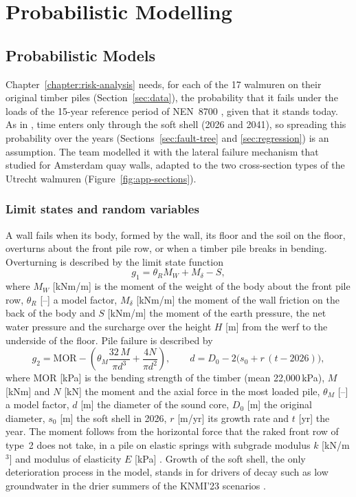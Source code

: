 \chapter{Probabilistic Modelling}
\label{chapter:probabilistic-modelling}

\section{Probabilistic Models}\label{sec:prob}

Chapter~\ref{chapter:risk-analysis} needs, for each of the 17 walmuren on
their original timber piles (Section~\ref{sec:data}), the probability that it
fails under the loads of the 15-year reference period of NEN~8700
\parencite{nen8700}, given that it stands today. As in \textcite{hemel2024},
time enters only through the soft shell (2026 and 2041), so spreading this
probability over the years (Sections~\ref{sec:fault-tree} and
\ref{sec:regression}) is an assumption. The team modelled it with the lateral failure mechanism that
\textcite{hemel2023,hemel2024} studied for Amsterdam quay walls, adapted to the
two cross-section types of the Utrecht walmuren \parencite{ibu2010,erfgoed156}
(Figure~\ref{fig:app-sections}).

\subsection{Limit states and random variables}\label{sec:prob-ls}

A wall fails when its body, formed by the wall, its floor and the soil on the
floor, overturns about the front pile row, or when a timber pile breaks in
bending. Overturning is described by the limit state function
\begin{equation}
g_1 = \theta_R M_W + M_\delta - S, \label{eq:g1}
\end{equation}
where $M_W$ [kNm/m] is the moment of the weight of the body about the front
pile row, $\theta_R$ [--] a model factor, $M_\delta$ [kNm/m] the moment of the
wall friction on the back of the body and $S$ [kNm/m] the moment of the earth
pressure, the net water pressure and the surcharge over the height $H$ [m]
from the werf to the underside of the floor. Pile failure is described by
\begin{equation}
g_2 = \mathrm{MOR} - \left(\theta_M \frac{32\,M}{\pi d^3} + \frac{4N}{\pi d^2}\right),
\qquad d = D_0 - 2\bigl(s_0 + r\,(t - 2026)\bigr), \label{eq:g2}
\end{equation}
where MOR [kPa] is the bending strength of the timber (mean 22{,}000\,kPa), $M$ [kNm] and $N$ [kN]
the moment and the axial force in the most loaded pile, $\theta_M$ [--] a
model factor, $d$ [m] the diameter of the sound core, $D_0$ [m] the original
diameter, $s_0$ [m] the soft shell in 2026, $r$ [m/yr] its growth rate and $t$
[yr] the year. The moment follows from the horizontal force that the raked
front row of type~2 does not take, in a pile on elastic springs with subgrade
modulus $k$ [kN/m$^3$] and modulus of elasticity $E$ [kPa] \parencite{hemel2023}.
Growth of the soft shell, the only deterioration process in the model, stands
in for drivers of decay such as low groundwater in the drier summers of the
KNMI'23 scenarios \parencite{knmi2023}.

